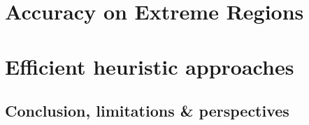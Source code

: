 \documentclass{ecsthesis}      %
\begin{document}
\part{Accuracy on Extreme Regions}\label{part:vect}




\part{Efficient heuristic approaches}
\label{part:heuristic}




\chapter{Conclusion, limitations \& perspectives}\label{chap:concl}


\appendix
%
%
\backmatter
{\small


}
%
\end{document}
